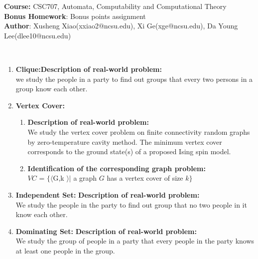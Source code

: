 \documentclass[article, 10pt,onecolumn]{article}
\begin{document}
\begin{flushleft}
\textbf{Course:} CSC707, Automata, Computability and Computational Theory\\
\textbf{Bonus Homework}: Bonus points assignment\\
\textbf{Author}: Xusheng Xiao(\small{xxiao2@ncsu.edu}), Xi Ge(\small{xge@ncsu.edu}), Da Young Lee(\small{dlee10@ncsu.edu})\\
\end{flushleft}

\begin{center}
\\
\end{center}
\noindent{\hrulefill}
\begin{enumerate}
\item \textbf{Clique:}\textbf{Description of real-world problem:}\\ 
   we study the people in a party to find out groups that every two persons in a group know each other. 
  
\item \textbf{Vertex Cover:}
  \begin{enumerate}
   \item \textbf{Description of real-world problem:}\\
    We study the vertex cover problem on finite connectivity random graphs by zero-temperature cavity method. The minimum vertex cover
    corresponds to the ground state(s) of a proposed Ising spin model.\cite{Vertex}
   \item \textbf{Identification of the corresponding graph problem:}\\
    $VC$ = $\{\langle $G,k $ \rangle | $ a graph $G$ has a vertex cover of size $k\}$ \\
  \end{enumerate}

\item \textbf{Independent Set:}
 	\textbf{Description of real-world problem:} \\
   	We study the people in the party to find out group that no two people in it know each other.
  
\item \textbf{Dominating Set:} \textbf{Description of real-world problem:}\\ 
   We study the group of people in a party that every people in the party knows at least one people in the group. 
  

\end{enumerate}
\end{document}
